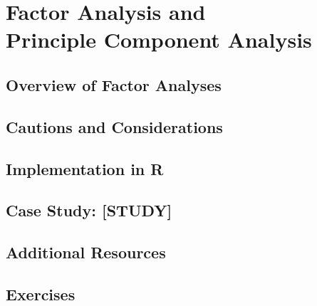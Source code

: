 
\chapter{Factor Analysis and\\ Principle Component Analysis}

\section{Overview of Factor Analyses}

\section{Cautions and Considerations}

\section{Implementation in R}

\section{Case Study: [STUDY]}

\section{Additional Resources}

\section{Exercises}